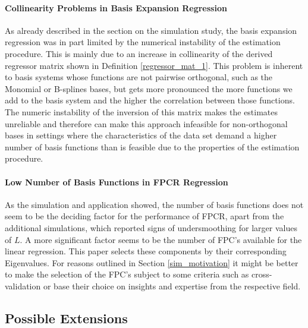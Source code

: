 \documentclass[11pt,twoside,a4paper]{article}
\begin{document}
	\paragraph{Collinearity Problems in Basis Expansion Regression}
	As already described in the section on the simulation study, the basis expansion regression was in part limited by the numerical instability of the estimation procedure. This is mainly due to an increase in collinearity of the derived regressor matrix shown in Definition \ref{regressor_mat_1}. This problem is inherent to basis systems whose functions are not pairwise orthogonal, such as the Monomial or B-splines bases, but gets more pronounced the more functions we add to the basis system and the higher the correlation between those functions. \\
	The numeric instability of the inversion of this matrix makes the estimates unreliable and therefore can make this approach infeasible for non-orthogonal bases in settings where the characteristics of the data set demand a higher number of basis functions than is feasible due to the properties of the estimation procedure.
	\vspace{-0.2cm}
	
	\paragraph{Low Number of Basis Functions in FPCR Regression}
	As the simulation and application showed, the number of basis functions does not seem to be the deciding factor for the performance of FPCR, apart from the additional simulations, which reported signs of undersmoothing for larger values of $L$. A more significant factor seems to be the number of FPC's available for the linear regression. This paper selects these components by their corresponding Eigenvalues. For reasons outlined in Section \ref{sim_motivation} it might be better to make the selection of the FPC's subject to some criteria such as cross-validation or base their choice on insights and expertise from the respective field.
	\vspace{-0.2cm}
	
	\subsection*{Possible Extensions}
	
\end{document}

